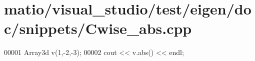 \hypertarget{matio_2visual__studio_2test_2eigen_2doc_2snippets_2_cwise__abs_8cpp_source}{}\section{matio/visual\+\_\+studio/test/eigen/doc/snippets/\+Cwise\+\_\+abs.cpp}
\label{matio_2visual__studio_2test_2eigen_2doc_2snippets_2_cwise__abs_8cpp_source}

\begin{DoxyCode}
00001 Array3d v(1,-2,-3);
00002 cout << v.abs() << endl;
\end{DoxyCode}
